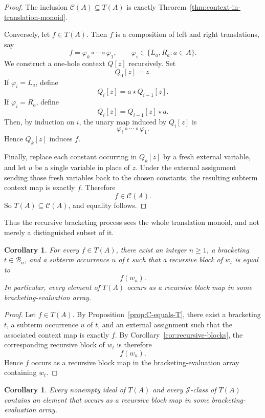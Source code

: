 \documentclass[11pt]{article}
\newtheorem{corollary}[theorem]{Corollary}
\begin{document}
\begin{proof}
The inclusion \(\mathcal C(A)\subseteq T(A)\) is exactly
Theorem~\ref{thm:context-in-translation-monoid}.

Conversely, let \(f\in T(A)\). Then \(f\) is a composition of left and right
translations, say
\[
f=\varphi_k\circ\cdots\circ \varphi_1,
\qquad
\varphi_i\in \{L_a,R_a:a\in A\}.
\]
We construct a one-hole context \(Q[z]\) recursively. Set
\[
Q_0[z]=z.
\]
If \(\varphi_i=L_a\), define
\[
Q_i[z]=a\star Q_{i-1}[z].
\]
If \(\varphi_i=R_a\), define
\[
Q_i[z]=Q_{i-1}[z]\star a.
\]
Then, by induction on \(i\), the unary map induced by \(Q_i[z]\) is
\[
\varphi_i\circ\cdots\circ\varphi_1.
\]
Hence \(Q_k[z]\) induces \(f\).

Finally, replace each constant occurring in \(Q_k[z]\) by a fresh external
variable, and let \(u\) be a single variable in place of \(z\). Under the
external assignment sending those fresh variables back to the chosen constants,
the resulting subterm context map is exactly \(f\). Therefore
\[
f\in \mathcal C(A).
\]
So \(T(A)\subseteq \mathcal C(A)\), and equality follows.
\end{proof}

Thus the recursive bracketing process sees the whole translation monoid, and not
merely a distinguished subset of it.

\newpage

\begin{corollary}\label{cor:every-element-realized}
For every \(f\in T(A)\), there exist an integer \(n\geq 1\), a bracketing
\(t\in \mathcal B_n\), and a subterm occurrence \(u\) of \(t\) such that a
recursive block of \(w_t\) is equal to
\[
f(w_u).
\]
In particular, every element of \(T(A)\) occurs as a recursive block map in
some bracketing-evaluation array.
\end{corollary}

\begin{proof}
Let \(f\in T(A)\). By Proposition~\ref{prop:C-equals-T}, there exist a
bracketing \(t\), a subterm occurrence \(u\) of \(t\), and an external
assignment such that the associated context map is exactly \(f\). By
Corollary~\ref{cor:recursive-blocks}, the corresponding recursive block of
\(w_t\) is therefore
\[
f(w_u).
\]
Hence \(f\) occurs as a recursive block map in the bracketing-evaluation array
containing \(w_t\).
\end{proof}

\begin{corollary}\label{cor:all-ideals-and-Jclasses-realized}
Every nonempty ideal of \(T(A)\) and every \(\mathcal J\)-class of \(T(A)\)
contains an element that occurs as a recursive block map in some
bracketing-evaluation array.
\end{corollary}
\end{document}
